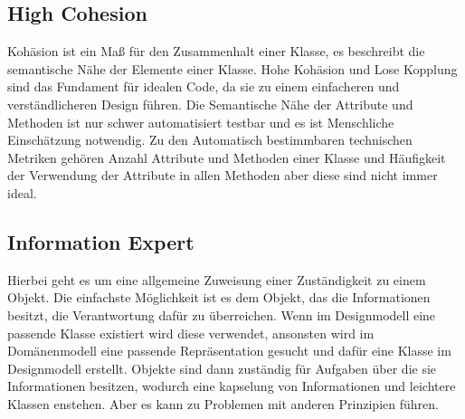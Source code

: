 \subsection{High Cohesion}
Kohäsion ist ein Maß für den Zusammenhalt einer Klasse, es beschreibt die semantische Nähe der Elemente einer Klasse.
Hohe Kohäsion und Lose Kopplung sind das Fundament für idealen Code, da sie zu einem einfacheren und verständlicheren Design führen.
Die Semantische Nähe der Attribute und Methoden ist nur schwer automatisiert testbar und es ist Menschliche Einschätzung notwendig.
Zu den Automatisch bestimmbaren technischen Metriken gehören Anzahl Attribute und Methoden einer Klasse und Häufigkeit der Verwendung der Attribute in allen Methoden aber diese sind nicht immer ideal.
\subsection{Information Expert}
Hierbei geht es um eine allgemeine Zuweisung einer Zuständigkeit zu einem Objekt.
Die einfachste Möglichkeit ist es dem Objekt, das die Informationen besitzt, die Verantwortung dafür zu überreichen.
Wenn im Designmodell eine passende Klasse existiert wird diese verwendet, ansonsten wird im Domänenmodell eine passende Repräsentation gesucht und dafür eine Klasse im Designmodell erstellt.
Objekte sind dann zuständig für Aufgaben über die sie Informationen besitzen, wodurch eine kapselung von Informationen und leichtere Klassen enstehen.
Aber es kann zu Problemen mit anderen Prinzipien führen.
